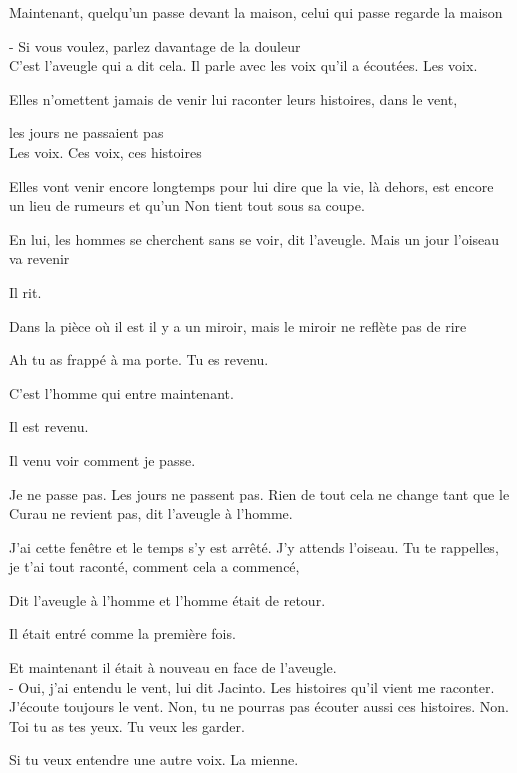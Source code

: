 Maintenant, quelqu'un passe devant la maison, celui qui passe regarde la
maison

\pagebreak

- Si vous voulez, parlez davantage de la douleur\\

C'est l'aveugle qui a dit cela. Il parle avec les voix qu'il a écoutées.
Les voix.

Elles n'omettent jamais de venir lui raconter leurs histoires, dans le
vent,

les jours ne passaient pas\\

Les voix. Ces voix, ces histoires

Elles vont venir encore longtemps pour lui dire que la vie, là dehors,
est encore un lieu de rumeurs et qu'un Non tient tout sous sa coupe.

En lui, les hommes se cherchent sans se voir, dit l'aveugle. Mais un
jour l'oiseau va revenir

Il rit.

Dans la pièce où il est il y a un miroir, mais le miroir ne reflète pas
de rire

\clearpage
\thispagestyle{empty}
\movetooddpage


Ah tu as frappé à ma porte. Tu es revenu.

C'est l'homme qui entre maintenant.

Il est revenu.

Il venu voir comment je passe.

Je ne passe pas. Les jours ne passent pas. Rien de tout cela ne change
tant que le Curau ne revient pas, dit l'aveugle à l'homme.

J'ai cette fenêtre et le temps s'y est arrêté. J'y attends l'oiseau. Tu
te rappelles, je t'ai tout raconté, comment cela a commencé,

Dit l'aveugle à l'homme et l'homme était de retour.

Il était entré comme la première fois.

Et maintenant il était à nouveau en face de l'aveugle.\\

- Oui, j'ai entendu le vent, lui dit Jacinto. Les histoires qu'il vient
me raconter. J'écoute toujours le vent. Non, tu ne pourras pas écouter
aussi ces histoires. Non. Toi tu as tes yeux. Tu veux les garder.

Si tu veux entendre une autre voix. La mienne.

\pagebreak

